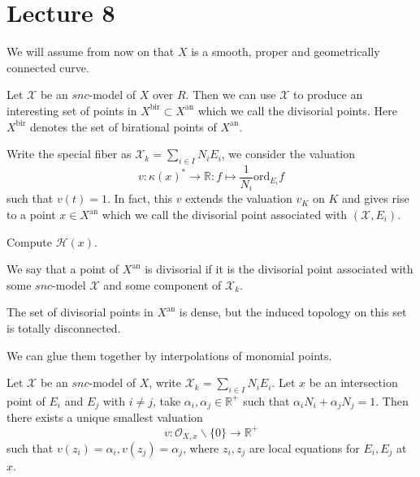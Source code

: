 \section{Lecture 8}

We will assume from now on that $X$ is a smooth, proper and geometrically connected curve.

Let $\mathscr{X}$ be an $snc$-model of $X$ over $R$. Then we can use $\mathscr{X}$ to produce an interesting set of
points in $X^{\mathrm{bir}}\subset X^{\mathrm{an}}$ which we call the divisorial points.
Here $X^{\mathrm{bir}}$ denotes the set of birational points
of $X^{\mathrm{an}}$.

Write the special fiber as $\mathscr{X}_{k}=\sum_{i\in I}N_{i}E_{i}$, we consider the valuation
\[
  v: \kappa(x)^{*}\rightarrow\mathbb{R}: f\mapsto \frac{1}{N_{i}}\mathrm{ord}_{E_{i}}f
\]
such that $v(t)=1$. In fact, this $v$ extends the valuation $v_{K}$ on $K$ and
gives rise to a point $x\in X^{\mathrm{an}}$ which we call the divisorial point associated with
$(\mathscr{X},E_{i})$.

\begin{exercise}
Compute $\mathscr{H}(x)$.
\end{exercise}

We say that a point of $X^{\mathrm{an}}$ is divisorial if it is the divisorial point associated with some
$snc$-model $\mathscr{X}$ and some component of $\mathscr{X}_{k}$.

\begin{fact}
The set of divisorial points in $X^{\mathrm{an}}$ is dense, but the induced topology on this set is totally disconnected.
\end{fact}
We can glue them together by interpolations of monomial points.

\begin{proposition}
Let $\mathscr{X}$ be an $snc$-model of $X$, write $\mathscr{X}_{k}=\sum_{i\in I}N_{i}E_{i}$. Let $x$ be an intersection
point of $E_{i}$ and $E_{j}$ with $i\neq j$, take $\alpha_{i},\alpha_{j}\in\mathbb{R}^{+}$ such that
$\alpha_{i}N_{i}+\alpha_{j}N_{j}=1$. Then there exists a unique smallest valuation
\[
   v:\mathcal{O}_{X,x}\backslash\{0\}\rightarrow\mathbb{R}^{+}
\]
such that $v(z_{i})=\alpha_{i},v(z_{j})=\alpha_{j}$, where $z_{i},z_{j}$ are local equations for $E_{i},E_{j}$
at $x$.
\end{proposition}

